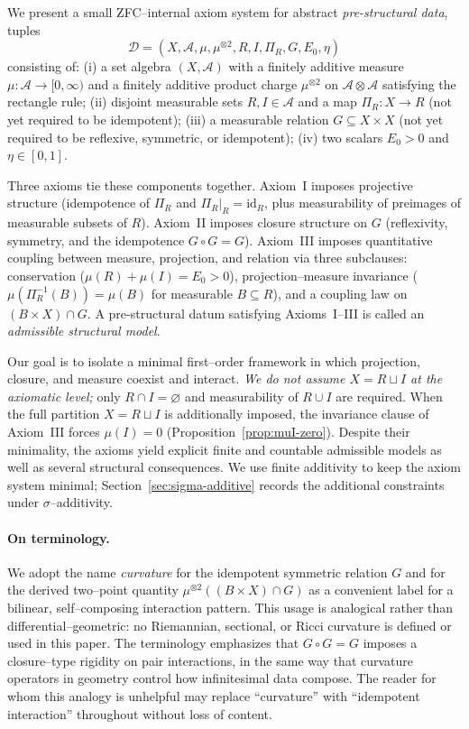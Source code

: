 \documentclass[11pt]{article}
\numberwithin{equation}{section}
\theoremstyle{definition}
\begin{document}
We present a small ZFC--internal axiom system for abstract \emph{pre-structural data}, tuples
\[
\mathcal D=(X,\mathcal A,\mu,\mu^{\otimes2},R,I,\Pi_R,G,E_0,\eta)
\]
consisting of:
(i) a set algebra $(X,\mathcal A)$ with a finitely additive measure $\mu:\mathcal A\to[0,\infty)$ and a finitely additive product charge $\mu^{\otimes2}$ on $\mathcal A\otimes\mathcal A$ satisfying the rectangle rule;
(ii) disjoint measurable sets $R,I\in\mathcal A$ and a map $\Pi_R:X\to R$ (not yet required to be idempotent);
(iii) a measurable relation $G\subseteq X\times X$ (not yet required to be reflexive, symmetric, or idempotent);
(iv) two scalars $E_0>0$ and $\eta\in[0,1]$.

Three axioms tie these components together. Axiom~I imposes projective structure (idempotence of $\Pi_R$ and $\Pi_R|_R=\mathrm{id}_R$, plus measurability of preimages of measurable subsets of $R$). Axiom~II imposes closure structure on $G$ (reflexivity, symmetry, and the idempotence $G\circ G=G$). Axiom~III imposes quantitative coupling between measure, projection, and relation via three subclauses: conservation ($\mu(R)+\mu(I)=E_0>0$), projection--measure invariance ($\mu(\Pi_R^{-1}(B))=\mu(B)$ for measurable $B\subseteq R$), and a coupling law on $(B\times X)\cap G$. A pre-structural datum satisfying Axioms~I--III is called an \emph{admissible structural model}.

Our goal is to isolate a minimal first--order framework in which projection, closure, and measure coexist and interact.
\emph{We do not assume $X=R\sqcup I$ at the axiomatic level;} only $R\cap I=\varnothing$ and measurability of $R\cup I$ are required. When the full partition $X=R\sqcup I$ is additionally imposed, the invariance clause of Axiom~III forces $\mu(I)=0$ (Proposition~\ref{prop:muI-zero}).
Despite their minimality, the axioms yield explicit finite and countable admissible models as well as several structural consequences.
We use finite additivity to keep the axiom system minimal; Section~\ref{sec:sigma-additive} records the additional constraints under $\sigma$--additivity.

\paragraph{On terminology.}
We adopt the name \emph{curvature} for the idempotent symmetric relation $G$ and for the derived two--point quantity $\mu^{\otimes2}((B\times X)\cap G)$ as a convenient label for a bilinear, self--composing interaction pattern. This usage is analogical rather than differential--geometric: no Riemannian, sectional, or Ricci curvature is defined or used in this paper. The terminology emphasizes that $G\circ G=G$ imposes a closure--type rigidity on pair interactions, in the same way that curvature operators in geometry control how infinitesimal data compose. The reader for whom this analogy is unhelpful may replace ``curvature'' with ``idempotent interaction'' throughout without loss of content.
\end{document}
